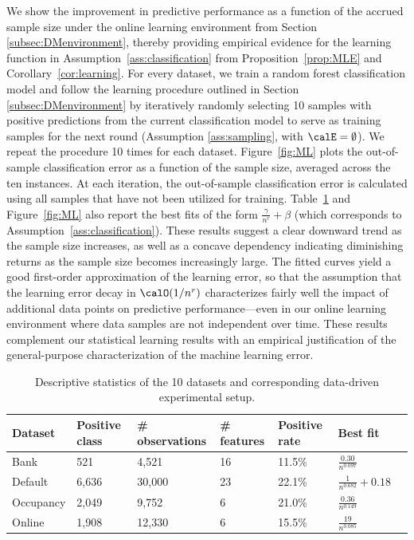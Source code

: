 \documentclass[blindrev]{informs3noheader}
\begin{document}
We show the improvement in predictive performance as a function of the accrued sample size under the online learning environment from Section \ref{subsec:DMenvironment}, thereby providing empirical evidence for the learning function in Assumption~\ref{ass:classification} from Proposition~\ref{prop:MLE} and Corollary~\ref{cor:learning}. For every dataset, we train a random forest classification model and follow the learning procedure outlined in Section \ref{subsec:DMenvironment} by iteratively randomly selecting 10 samples with positive predictions from the current classification model to serve as training samples for the next round (Assumption \ref{ass:sampling}, with $\calE=\emptyset$). We repeat the procedure 10 times for each dataset. Figure~\ref{fig:ML} plots the out-of-sample classification error as a function of the sample size, averaged across the ten instances. At each iteration, the out-of-sample classification error is calculated using all samples that have not been utilized for training. Table~\ref{tab:dataset} and Figure~\ref{fig:ML} also report the best fits of the form $\frac{\gamma}{n^r}+\beta$ (which corresponds to Assumption~\ref{ass:classification}). These results suggest a clear downward trend as the sample size increases, as well as a concave dependency indicating diminishing returns as the sample size becomes increasingly large. The fitted curves yield a good first-order approximation of the learning error, so that the assumption that the learning error decay in $\calO(1/n^r)$ characterizes fairly well the impact of additional data points on predictive performance---even in our online learning environment where data samples are not independent over time. These results complement our statistical learning results with an empirical justification of the general-purpose characterization of the machine learning error.

\begin{table}[h!]
\centering \small
\caption{Descriptive statistics of the 10 datasets and corresponding data-driven experimental setup.}
\label{tab:dataset}
\renewcommand{\arraystretch}{1.3}
\begin{tabular}{lllllll}
\toprule[1pt]
Dataset & Positive class & \# observations & \# features & Positive rate & Best fit\\ \midrule[0.5pt]
Bank & 521 & 4,521 & 16 & 11.5\% & $\frac{0.30}{n^{0.097}}$ \\
Default & 6,636 & 30,000 & 23 & 22.1\% & $\frac{1}{n^{0.682}}+0.18$ \\
Occupancy & 2,049 & 9,752 & 6 & 21.0\% & $\frac{0.36}{n^{0.149}}$\\
Online & 1,908 & 12,330 & 6 & 15.5\% & $\frac{19}{n^{0.085}}$ \\
\bottomrule[1pt] 
\end{tabular}
\end{table}
\end{document}
